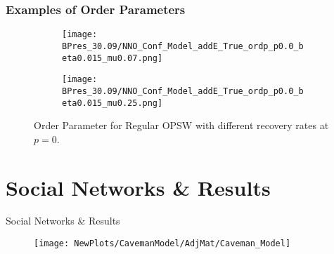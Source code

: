 \documentclass[xcolor={dvipsnames}]{beamer}
\begin{document}
\begin{frame}
	\frametitle{Examples of Order Parameters}
	\begin{figure}[t]
		\begin{subfigure}[t]{0.6\linewidth}
			\vspace{-.5cm}
			\centering
			\texttt{[image: BPres\_30.09/NNO\_Conf\_Model\_addE\_True\_ordp\_p0.0\_beta0.015\_mu0.07.png]} 
			\label{fig:Ordp_OPSW_COVID19_D14}
		\end{subfigure}
		\begin{subfigure}[t]{0.6\linewidth}
			\vspace{-0.5cm}
			\centering
			\texttt{[image: BPres\_30.09/NNO\_Conf\_Model\_addE\_True\_ordp\_p0.0\_beta0.015\_mu0.25.png]}
			\label{fig:Ordp_OPSW_highmu_COVID19}
		\end{subfigure}
		\caption{Order Parameter for Regular OPSW with different recovery rates at $p = 0$. }
		\label{fig:Ordp_OPSW_COVID19_panel}
	\end{figure}
\end{frame}

\section{Social Networks \& Results}
\begin{frame}{Social Networks \& Results}
	\vspace{-3mm}
	\begin{figure}
		\centering
		\texttt{[image: NewPlots/CavemanModel/AdjMat/Caveman\_Model]}
	\end{figure}
\end{frame}
\end{document}
